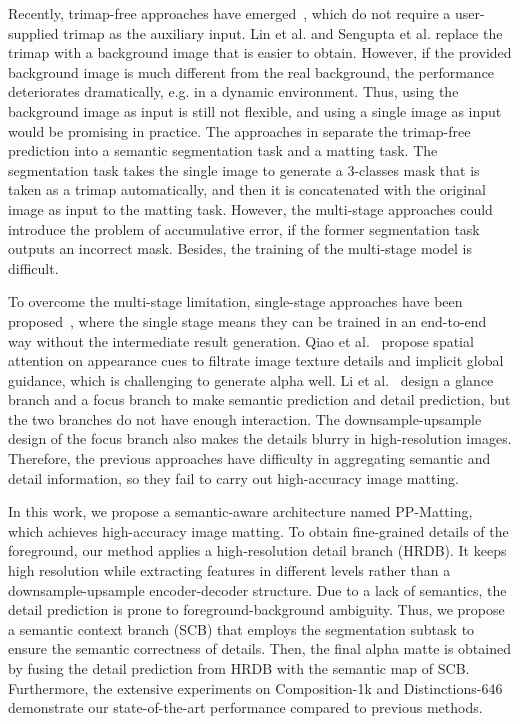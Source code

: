 \documentclass[10pt,twocolumn,letterpaper]{article}
\begin{document}
Recently, trimap-free approaches have emerged~\cite{zhang2019late,yu2020high,chen2018semantic,deora2021salient,liu2020boosting,yu2021cascade,ke2020green,li2021deep,li2022bridging, lin2021real, sengupta2020background}, which do not require a user-supplied trimap as the auxiliary input. Lin et al. \cite{lin2021real} and Sengupta et al. \cite{sengupta2020background} replace the trimap with a background image that is easier to obtain. However, if the provided background image is much different from the real background, the performance deteriorates dramatically, e.g. in a dynamic environment. Thus, using the background image as input is still not flexible, and using a single image as input 
would be promising in practice. The approaches in \cite{sharma2020alphanet, deora2021salient, chen2018semantic} separate the trimap-free prediction into a semantic segmentation task and a matting task. The segmentation task takes the single image to generate a 3-classes mask that is taken as a trimap automatically, and then it is concatenated with the original image as input to the matting task. However, the multi-stage approaches could introduce the problem of accumulative error, if the former segmentation task outputs an incorrect mask. Besides, the training of the multi-stage model is difficult.

To overcome the multi-stage limitation, single-stage approaches have been proposed~\cite{qiao2020attention,li2022bridging, li2021deep}, where the single stage means they can be trained in an end-to-end way without the intermediate result generation. Qiao et al.~\cite{qiao2020attention} propose spatial attention on appearance cues to filtrate image texture details and implicit global guidance, which is challenging to generate alpha well. Li et al.~\cite{li2022bridging, li2021deep} design a glance branch and a focus branch to make semantic prediction and detail prediction, but the two branches do not have enough interaction. The downsample-upsample design of the focus branch also makes the details blurry in high-resolution images. Therefore, the previous approaches have difficulty in aggregating semantic and detail information, so they fail to carry out high-accuracy image matting.

In this work, we propose a semantic-aware architecture named PP-Matting, which achieves high-accuracy image matting. To obtain fine-grained details of the foreground, our method applies a high-resolution detail branch (HRDB). It keeps high resolution while extracting features in different levels rather than a downsample-upsample encoder-decoder structure. Due to a lack of semantics, the detail prediction is prone to foreground-background ambiguity. Thus, we propose a semantic context branch (SCB) that employs the segmentation subtask to ensure the semantic correctness of details. Then, the final alpha matte is obtained by fusing the detail prediction from HRDB with the semantic map of SCB. Furthermore, the extensive experiments on Composition-1k and Distinctions-646 demonstrate our state-of-the-art performance compared to previous methods.
\end{document}
